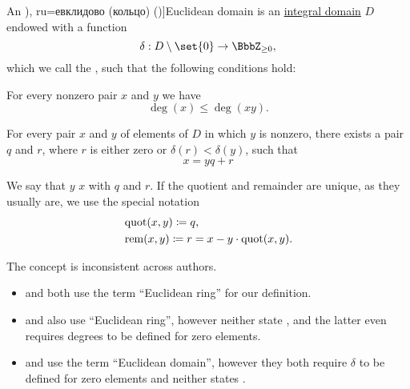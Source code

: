 \begin{definition}\label{def:euclidean_domain}
  An \term[bg=евклидов (пръстен) (\cite[def. VI.2]{ГеновИПр1991Алгебра}), ru=евклидово (кольцо) (\cite[def. 3.5.2]{Винберг2014Алгебра})]{Euclidean domain} is an \hyperref[def:integral_domain]{integral domain} \( D \) endowed with a function
  \begin{equation*}
    \delta: D \setminus \set{ 0 } \to \BbbZ_{\geq 0},
  \end{equation*}
  which we call the , such that the following conditions hold:
  \begin{thmenum}
      For every nonzero pair \( x \) and \( y \) we have
    \begin{equation}\label{eq:def:euclidean_domain/multiplication}
      \deg(x) \leq \deg(xy).
    \end{equation}

     For every pair \( x \) and \( y \) of elements of \( D \) in which \( y \) is nonzero, there exists a pair \( q \) and \( r \), where \( r \) is either zero or \( \delta(r) < \delta(y) \), such that
    \begin{equation}\label{eq:def:euclidean_domain/division}
      x = yq + r
    \end{equation}
  \end{thmenum}

  We say that \( y \)  \( x \) with  \( q \) and  \( r \). If the quotient and remainder are unique, as they usually are, we use the special notation
  \begin{align*}
    &\operatorname{quot}(x, y) \coloneqq q, \\
    &\operatorname{rem}(x, y) \coloneqq r = x - y \cdot \operatorname{quot}(x, y).
  \end{align*}
\end{definition}
\begin{comments}
  \item The concept is inconsistent across authors.
  \begin{itemize}
    \item {} and  both use the term \enquote{Euclidean ring} for our definition.
    \item {} and  also use \enquote{Euclidean ring}, however neither state , and the latter even requires degrees to be defined for zero elements.
    \item {} and  use the term \enquote{Euclidean domain}, however they both require \( \delta \) to be defined for zero elements and neither states .
  \end{itemize}
\end{comments}

